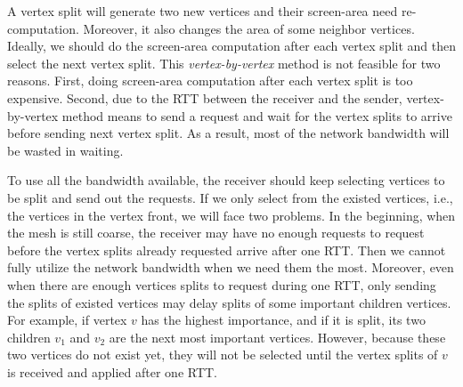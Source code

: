     A vertex split will generate two new vertices and their screen-area need re-computation.
    Moreover, it also changes the area of some neighbor vertices. Ideally, we should 
    do the screen-area computation after each vertex split and then select the next 
    vertex split. This \emph{vertex-by-vertex} method is not feasible for two reasons.
    First, doing screen-area computation after each vertex split is too expensive. Second,
    due to the RTT between the receiver and the sender, vertex-by-vertex method means
    to send a request and wait for the vertex splits to arrive before sending next vertex
    split. As a result, most of the network bandwidth will be wasted in waiting. 
    
    To use all the bandwidth available, the receiver should keep selecting vertices to be split
    and send out the requests. If we only select from the existed vertices, i.e.,
    the vertices in the vertex front, we will face two problems.
    In the beginning, when the mesh is still coarse, the receiver may have no enough requests
    to request before the vertex splits already requested arrive after one RTT. 
    Then we cannot fully utilize the network bandwidth when we need them the most.
    Moreover, even when there are enough vertices splits to request during one RTT, only sending
    the splits of existed vertices may delay splits of some important children vertices.
    For example, if vertex $v$ has the highest importance, and if it is split, its two 
    children $v_1$ and $v_2$ are the next most important vertices. However, because these
    two vertices do not exist yet, they will not be selected until the vertex splits of $v$ 
    is received and applied after one RTT.

